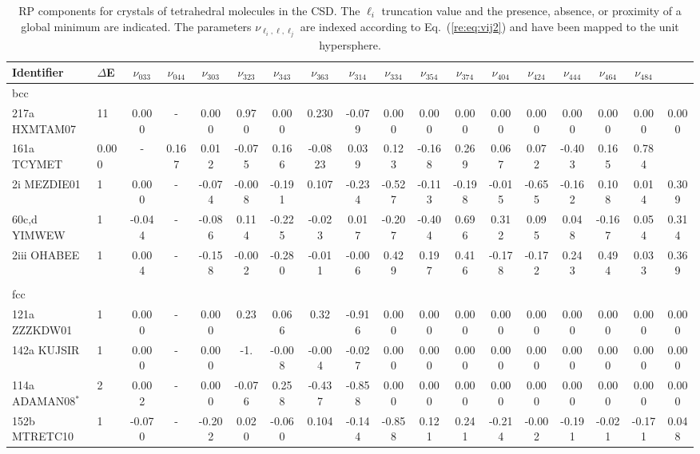 \documentclass[preprint]{revtex4}
\begin{document}
\begin{table}[!ht]
\caption{RP components for crystals of tetrahedral molecules in the
CSD.  The $\ell_i$ truncation value and the presence, absence, or
proximity of a global minimum are indicated. The parameters
$\nu_{\ell_i,\ell,\ell_j}$ are indexed according to
Eq.~(\ref{re:eq:vij2}) and have been mapped to the unit hypersphere.}
\label{RPTop} \tiny
\begin{tabular}{llcccccccccccccccc}\hline
Identifier & $\Delta$E & $\nu_{033}$ & $\nu_{044}$ & $\nu_{303}$ &
$\nu_{323}$ & $\nu_{343}$ & $\nu_{363}$ & $\nu_{314}$ & $\nu_{334}$
& $\nu_{354}$ & $\nu_{374}$ & $\nu_{404}$ & $\nu_{424}$ &
$\nu_{444}$ & $\nu_{464}$ & $\nu_{484}$ \\
\hline
bcc\\
217a HXMTAM07 & 11 & 0.000 & - & 0.000 & 0.970 & 0.000 & 0.230 & -0.079 & 0.000 & 0.000 & 0.000 & 0.000 & 0.000 & 0.000 & 0.000 & 0.000 & 0.000 \\ 161a TCYMET & 0.000 & - & 0.167 & 0.012 & -0.075 & 0.166 & -0.0823 & 0.039 & 0.123 & -0.168 & 0.269 & 0.067 & 0.072 & -0.403 & 0.165 & 0.784 \\
2i MEZDIE01 & 1 & 0.000 & - & -0.074 & -0.008 & -0.191 & 0.107 & -0.234 & -0.527 & -0.113 & -0.198 & -0.015 & -0.655 & -0.162 & 0.108 & 0.014 & 0.309 \\
60c,d YIMWEW & 1 & -0.044 & - & -0.086 & 0.114 & -0.225 & -0.023 & 0.017 & -0.207 & -0.404 & 0.696 & 0.312 & 0.095 & 0.048 & -0.167 & 0.054 & 0.314 \\
2iii OHABEE & 1 & 0.004 & - & -0.158 & -0.002 & -0.280 & -0.011 & -0.006 & 0.429 & 0.197 & 0.416 & -0.178 & -0.172 & 0.243 & 0.494 & 0.033 & 0.369 \\
\\
fcc\\
121a ZZZKDW01 & 1 & 0.000 & - & 0.000 & 0.23 & 0.066 & 0.32 & -0.916 & 0.000 & 0.000 & 0.000 & 0.000 & 0.000 & 0.000 & 0.000 & 0.000 & 0.000 \\
142a KUJSIR & 1 & 0.000 & - & 0.000 & -1. & -0.008 & -0.004 & -0.027 & 0.000 & 0.000 & 0.000 & 0.000 & 0.000 & 0.000 & 0.000 & 0.000 & 0.000 \\
114a ADAMAN08$^*$ & 2 & 0.002 & - & 0.000 & -0.076 & 0.258 & -0.437 & -0.858 & 0.000 & 0.000 & 0.000 & 0.000 & 0.000 & 0.000 & 0.000 & 0.000 & 0.000 \\
152b MTRETC10 & 1 & -0.070 & -  & -0.202 & 0.020 & -0.060 & 0.104 & -0.144 & -0.858 & 0.121 & 0.241 & -0.214 & -0.002 & -0.191 & -0.021 & -0.171 & 0.048 \\

\end{tabular}
\end{table}
\end{document}
